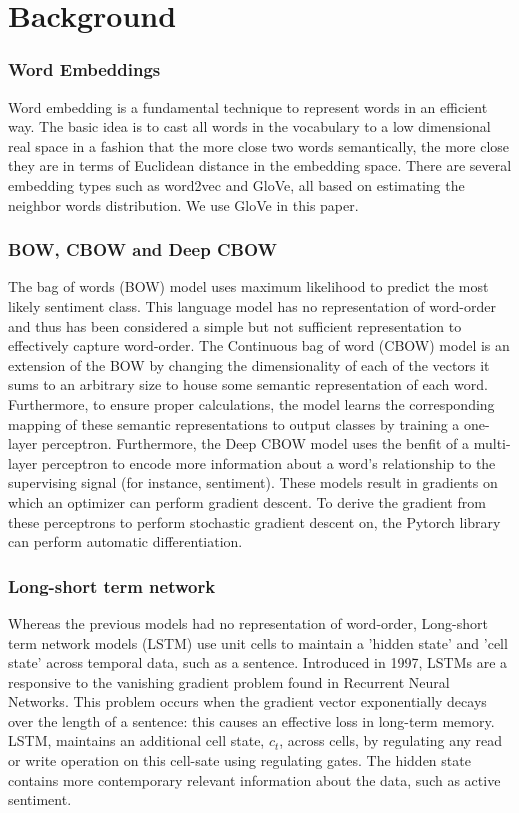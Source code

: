 \section{Background}
\label{sec: background}

\subsubsection{Word Embeddings}
Word embedding is a fundamental technique to represent words in an efficient
way. The basic idea is to cast all words in the vocabulary to a low dimensional
real space in a fashion that the more close two words semantically, the more
close they are in terms of Euclidean distance in the embedding space. There are
several embedding types such as word2vec\cite{mikolov2013distributed} and
GloVe\cite{pennington2014glove}, all based on estimating the neighbor words
distribution. We use GloVe in this paper.
 
\subsubsection{BOW, CBOW and Deep CBOW}
The bag of words (BOW) model uses maximum likelihood to predict the most likely
sentiment class. This language model has no representation of word-order and
thus has been considered a simple but not sufficient representation to
effectively capture word-order. The Continuous bag of word (CBOW)
model\cite{DBLP:journals/corr/abs-1301-3781} is an extension of the BOW by
changing the dimensionality of each of the vectors it sums to an arbitrary size
to house some semantic representation of each word. Furthermore, to ensure
proper calculations, the model learns the corresponding mapping of these
semantic representations to output classes by training a one-layer perceptron.
Furthermore, the Deep CBOW model uses the benfit of a multi-layer perceptron to
encode more information about a word's relationship to the supervising signal
(for instance, sentiment). These models result in gradients on which an
optimizer can perform gradient descent. To derive the gradient from these
perceptrons to perform stochastic gradient descent on, the Pytorch library can
perform automatic differentiation\cite{paszke2017automatic}.

\subsubsection{Long-short term network}
Whereas the  previous models had no representation of word-order, Long-short
term network models (LSTM) use unit cells to maintain a 'hidden state' and 'cell
state' across temporal data, such as a sentence. Introduced in
1997\cite{hochreiter1997long}, LSTMs are a responsive to the vanishing gradient
problem found in Recurrent Neural Networks\cite{bengio1994learning}. This
problem occurs when the gradient vector exponentially decays over the length of
a sentence: this causes an effective loss in long-term memory. LSTM, maintains
an additional cell state, $c_t$, across cells, by regulating any read or write
operation on this cell-sate using regulating gates. The hidden state contains
more contemporary relevant information about the data, such as active sentiment.

